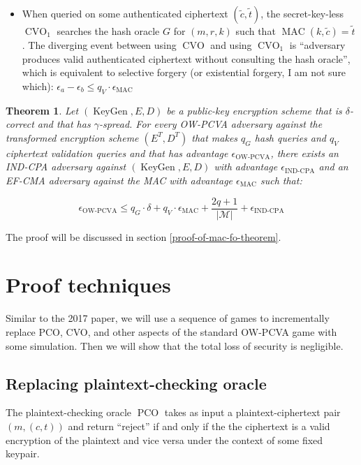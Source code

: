 \documentclass{article}
\newcommand{\norm}[1]{\vert {#1} \vert}
\newcommand{\keygen}{\operatorname{KeyGen}}
\newtheorem{theorem}{Theorem}[section]
\begin{document}
\begin{itemize}
    \item When queried on some authenticated ciphertext $(\tilde{c}, \tilde{t})$, the secret-key-less $\operatorname{CVO}_1$ searches the hash oracle $G$ for $(m, r, k)$ such that $\operatorname{MAC}(k, \tilde{c}) = \tilde{t}$. The diverging event between using $\operatorname{CVO}$ and using $\operatorname{CVO}_1$ is ``adversary produces valid authenticated ciphertext without consulting the hash oracle'', which is equivalent to selective forgery (or existential forgery, I am not sure which): $\epsilon_a - \epsilon_b \leq q_V \cdot \epsilon_\text{MAC}$
\end{itemize}

\begin{theorem}\label{mac-fo-theorem}
    Let $(\keygen, E, D)$ be a public-key encryption scheme that is $\delta$-correct and that has $\gamma$-spread. For every OW-PCVA adversary against the transformed encryption scheme $(E^T, D^T)$ that makes $q_G$ hash queries and $q_V$ ciphertext validation queries and that has advantage $\epsilon_\text{OW-PCVA}$, there exists an IND-CPA adversary against $(\keygen, E, D)$ with advantage $\epsilon_\text{IND-CPA}$ and an EF-CMA adversary against the MAC with advantage $\epsilon_\text{MAC}$ such that:

    \begin{equation*}
        \epsilon_\text{OW-PCVA}
        \leq q_G \cdot \delta 
        + q_V \cdot \epsilon_\text{MAC}
        + \frac{2q+1}{\norm{\mathcal{M}}} 
        + \epsilon_\text{IND-CPA}
    \end{equation*}
\end{theorem}

The proof will be discussed in section \ref{proof-of-mac-fo-theorem}.

\section{Proof techniques}
Similar to the 2017 paper, we will use a sequence of games to incrementally replace PCO, CVO, and other aspects of the standard OW-PCVA game with some simulation. Then we will show that the total loss of security is negligible.

\subsection{Replacing plaintext-checking oracle}\label{replacing-pco}
The plaintext-checking oracle $\operatorname{PCO}$ takes as input a plaintext-ciphertext pair $(m, (c, t))$ and return ``reject'' if and only if the the ciphertext is a valid encryption of the plaintext and vice versa under the context of some fixed keypair.
\end{document}
